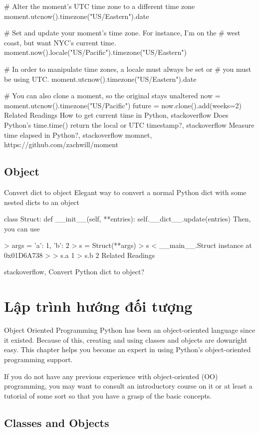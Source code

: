 # Alter the moment's UTC time zone to a different time zone
moment.utcnow().timezone("US/Eastern").date

# Set and update your moment's time zone. For instance, I'm on the
# west coast, but want NYC's current time.
moment.now().locale("US/Pacific").timezone("US/Eastern")

# In order to manipulate time zones, a locale must always be set or
# you must be using UTC.
moment.utcnow().timezone("US/Eastern").date

# You can also clone a moment, so the original stays unaltered
now = moment.utcnow().timezone("US/Pacific")
future = now.clone().add(weeks=2)
Related Readings
How to get current time in Python, stackoverflow
Does Python's time.time() return the local or UTC timestamp?, stackoverflow
Measure time elapsed in Python?, stackoverflow
momnet, https://github.com/zachwill/moment

\subsection{Object}

Convert dict to object
Elegant way to convert a normal Python dict with some nested dicts to an object

class Struct:
    def __init__(self, **entries):
        self.__dict__.update(entries)
Then, you can use

> args = {'a': 1, 'b': 2}
> s = Struct(**args)
> s
< __main__.Struct instance at 0x01D6A738 >
> s.a
1
> s.b
2
Related Readings

stackoverflow, Convert Python dict to object?

\section{Lập trình hướng đối tượng}

Object Oriented Programming
Python has been an object-oriented language since it existed. Because of this, creating and using classes and objects are downright easy. This chapter helps you become an expert in using Python's object-oriented programming support.

If you do not have any previous experience with object-oriented (OO) programming, you may want to consult an introductory course on it or at least a tutorial of some sort so that you have a grasp of the basic concepts.

\subsection{Classes and Objects}

